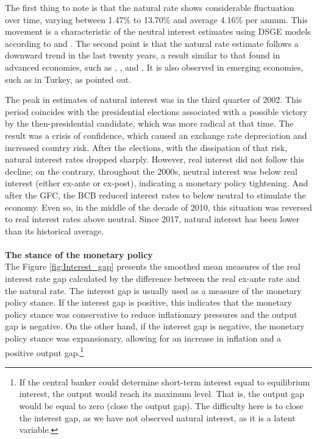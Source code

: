 \documentclass[12pt,oneside,a4paper]{article}
\begin{document}
The first thing to note is that the natural rate shows considerable fluctuation over time, varying between 1.47\% to 13.70\% and average 4.16\% per annum. This movement is a characteristic of the neutral interest estimates using DSGE models according to  \citet{Justiniano:2010} and \citet{DelNegro:2017}. The second point is that the natural rate estimate follows a downward trend in the last twenty years, a result similar to that found in advanced economies, such as \citet{Melosi:2015}, \citet{Hristov:2016}, \citet{Okazaki:2018} and \citet{Neri:2018}. It is also observed in emerging economies, such as in Turkey, as \citet{Us:2018} pointed out.

The peak in estimates of natural interest was in the third quarter of 2002. This period coincides with the presidential elections associated with a possible victory by the then-presidential candidate, which was more radical at that time. The result was a crisis of confidence, which caused an exchange rate depreciation and increased country risk. After the elections, with the dissipation of that risk, natural interest rates dropped sharply. However, real interest did not follow this decline; on the contrary, throughout the 2000s, neutral interest was below real interest (either ex-ante or ex-post), indicating a  monetary policy tightening. And after the GFC, the BCB reduced interest rates to below neutral to stimulate the economy. Even so, in the middle of the decade of 2010, this situation was reversed to real interest rates above neutral. Since 2017, natural interest has been lower than its historical average.
\\
\\

\textbf{The stance of the monetary policy} \\

The Figure \ref{fig:Interest_gap} presents the smoothed mean measures of the real interest rate gap calculated by the difference between the real ex-ante rate and the natural rate. The interest gap is usually used as a measure of the monetary policy stance. If the interest gap is positive, this indicates that the monetary policy stance was conservative to reduce inflationary pressures and the output gap is negative. On the other hand, if the interest gap is negative, the monetary policy stance was expansionary, allowing for an increase in inflation and a positive output gap.\footnote{If the central banker could determine short-term interest equal to equilibrium interest, the output would reach its maximum level. That is, the output gap would be equal to zero (close the output gap). The difficulty here is to close the interest gap, as we have not observed natural interest, as it is a latent variable.}
\end{document}
